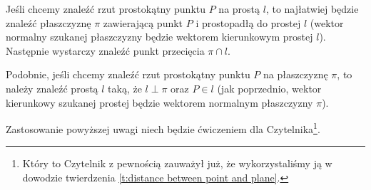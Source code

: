 \begin{remark*}
    Jeśli chcemy znaleźć rzut prostokątny punktu $P$ na prostą $l$, to najłatwiej będzie znaleźć płaszczyznę $\pi$ zawierającą punkt $P$ i prostopadłą do prostej $l$ (wektor normalny szukanej płaszczyzny będzie wektorem kierunkowym prostej $l$). Następnie wystarczy znaleźć punkt przecięcia $\pi \cap l$.

    Podobnie, jeśli chcemy znaleźć rzut prostokątny punktu $P$ na płaszczyznę $\pi$, to należy znaleźć prostą $l$ taką, że $l \perp \pi$ oraz $P \in l$ (jak poprzednio, wektor kierunkowy szukanej prostej będzie wektorem normalnym płaszczyzny $\pi$).
\end{remark*}

Zastosowanie powyższej uwagi niech będzie ćwiczeniem dla Czytelnika\footnote{Który to Czytelnik z pewnością zauważył już, że wykorzystaliśmy ją w dowodzie twierdzenia \ref{t:distance between point and plane}.}.